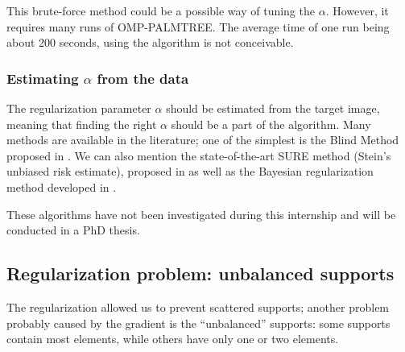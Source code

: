 
\noindent
This brute-force method could be a possible way of tuning the $\alpha$. However, it requires many runs of OMP-PALMTREE. The average time of one run being about 200 seconds, using the algorithm is not conceivable.

\subsubsection{Estimating $\alpha$ from the data}

The regularization parameter $\alpha$ should be estimated from the target image, meaning that finding the right $\alpha$ should be a part of the algorithm. Many methods are available in the literature; one of the simplest is the Blind Method proposed in \cite{almeida_parameter_2013}. We can also mention the state-of-the-art SURE method (Stein’s unbiased risk estimate), proposed in \cite{eldar_generalized_2009} as well as the Bayesian regularization method developed in \cite{archer_bayesian/regularization_1995}.

These algorithms have not been investigated during this internship and will be conducted in a PhD thesis.

\subsection{Regularization problem: unbalanced supports}\label{sec_pbm_unbalanced_supports}
The regularization allowed us to prevent scattered supports; another problem probably caused by the gradient is the “unbalanced” supports: some supports contain most elements, while others have only one or two elements. 

